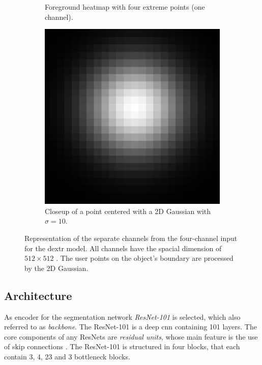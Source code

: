 \begin{figure}
\begin{subfigure}[t]{0.3\textwidth}
		\caption{Foreground heatmap with four extreme points (one channel).}
		\label{fig:ch3:sec3:fg_channel}
	\end{subfigure}
	\hfill
	\begin{subfigure}[t]{0.3\textwidth}
		\centering
		\includegraphics[width=\textwidth]{figures/chap33_gaussian_point.png}
		\caption{Closeup of a point centered with a 2D Gaussian with $\sigma = 10$.}
		\label{fig:ch3:sec3:gauss_centered_point}
	\end{subfigure}
	\caption[Four-channel DEXTR model input]{
		Representation of the separate channels from the four-channel input for the \gls{dextr} model.
		All channels have the spacial dimension of $512 \times 512$ .
		The user points on the object's boundary are processed by the 2D Gaussian.
	} \label{fig:ch3:sec3:model_input_channels}
\end{figure}


\subsection{Architecture}\label{ord:ch3:sec3:subsec3}

As encoder for the segmentation network \textit{ResNet-101} \cite{He16-ResNet} is selected, which also referred to as \textit{backbone}.
The ResNet-101 is a deep \gls{cnn} containing 101 layers.
The core components of any ResNets are \textit{residual units}, whose main feature is the use of skip connections \cite{Ger17-HandsOn}.
The ResNet-101 is structured in four blocks, that each contain 3, 4, 23 and 3 bottleneck blocks.

